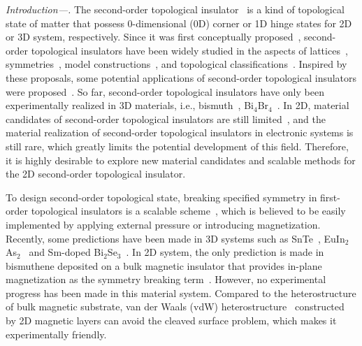 \documentclass[aps,prl,twocolumn,showpacs,superscriptaddress]{revtex4-1}
\begin{document}
\textit{Introduction---.} The second-order topological insulator~\cite{2013_Fan,2017_Benalcazar,2017_PRB_Benalcazar,2018_Ezawa,2020_R_Chen,2020_Chun_Bo_Hua,2020_Agarwala,2018_Schindler,2017_Langbehn,2017_Song,2018_Geier,2018_Khalaf,2018_Miert,2019_Benalcazar,2018_Kunst,2020_YB_Yang,2020_QB_Zeng,2018_Ezawa2,2019_F_Liu,2019_Calugaru,2019_K_Kudo,2020_Ren,2020_Rui_Xing,2019_Trifunovic,2020_Rasmussen} is a kind of topological state of matter that possess 0-dimensional (0D) corner or 1D hinge states for 2D or 3D system, respectively. Since it was first conceptually proposed~\cite{2017_Benalcazar,2017_PRB_Benalcazar}, second-order topological insulators have been widely studied in the aspects of lattices~\cite{2018_Ezawa,2020_R_Chen,2020_Chun_Bo_Hua,2020_Agarwala}, symmetries~\cite{2018_Schindler,2017_Langbehn,2017_Song,2018_Geier,2018_Khalaf,2018_Miert,2019_Benalcazar}, model constructions~\cite{2018_Kunst,2020_YB_Yang,2020_QB_Zeng,2018_Ezawa2,2019_F_Liu,2019_Calugaru,2019_K_Kudo,2020_Ren,2020_Rui_Xing}, and topological classifications~\cite{2019_Trifunovic,2020_Rasmussen}. Inspired by these proposals, some potential applications of second-order topological insulators were proposed~\cite{2020_Banerjee,2021_chang_An}. So far, second-order topological insulators have only been experimentally realized in 3D materials, i.e., bismuth~\cite{2018_Schindler2}, Bi$_4$Br$_4$~\cite{2021_Noguchi}. In 2D, material candidates of second-order topological insulators are still limited~\cite{2019_Sheng,2020_E. Lee,2019_Bing_Liu,2021_Cong_Chen,2019_Park,2021_Bing_Liu,2020_Cong Chen}, and the material realization of second-order topological insulators in electronic systems is still rare, which greatly limits the potential development of this field. Therefore, it is highly desirable to explore new material candidates and scalable methods for the 2D second-order topological insulator.

To design second-order topological state, breaking specified symmetry in first-order topological insulators is a scalable scheme~\cite{2020_Ren}, which is believed to be easily implemented by applying external pressure or introducing magnetization. Recently, some predictions have been made in 3D systems such as SnTe~\cite{2018_Schindler}, EuIn$_2$As$_2$~\cite{2019_Yuanfeng Xu} and Sm-doped Bi$_{2}$Se$_3$~\cite{2019_Yue}. In 2D system, the only prediction is made in bismuthene deposited on a bulk magnetic insulator that provides in-plane magnetization as the symmetry breaking term~\cite{2020_Cong Chen}. However, no experimental progress has been made in this material system. Compared to the heterostructure of bulk magnetic substrate, van der Waals (vdW) heterostructure~\cite{2013_Geim,2016_Novoselov} constructed by 2D magnetic layers can avoid the cleaved surface problem, which makes it experimentally friendly.
\end{document}
